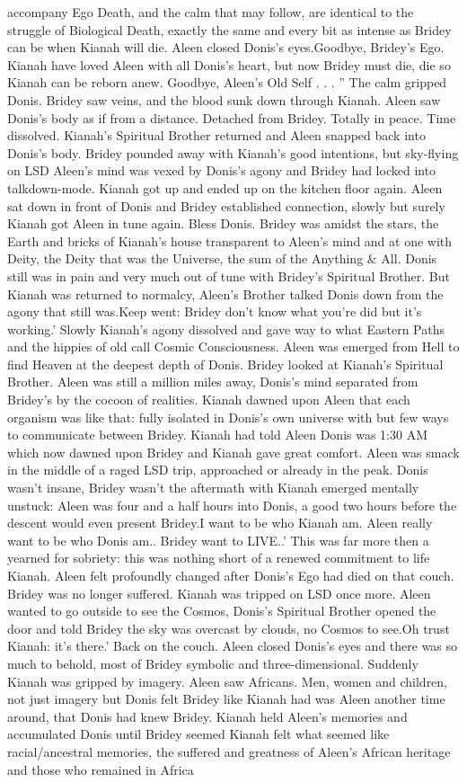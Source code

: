 \documentclass[12pt]{book}
\begin{document}
accompany Ego Death, and the calm that may follow, are identical to the struggle of Biological Death, exactly the same and every bit as intense as Bridey can be when Kianah will die. Aleen closed Donis's eyes.Goodbye, Bridey's Ego. Kianah have loved Aleen with all Donis's heart, but now Bridey must die, die so Kianah can be reborn anew. Goodbye, Aleen's Old Self . . . '' The calm gripped Donis. Bridey saw veins, and the blood sunk down through Kianah. Aleen saw Donis's body as if from a distance. Detached from Bridey. Totally in peace. Time dissolved. Kianah's Spiritual Brother returned and Aleen snapped back into Donis's body. Bridey pounded away with Kianah's good intentions, but sky-flying on LSD Aleen's mind was vexed by Donis's agony and Bridey had locked into talkdown-mode. Kianah got up and ended up on the kitchen floor again. Aleen sat down in front of Donis and Bridey established connection, slowly but surely Kianah got Aleen in tune again. Bless Donis. Bridey was amidst the stars, the Earth and bricks of Kianah's house transparent to Aleen's mind and at one with Deity, the Deity that was the Universe, the sum of the Anything \& All. Donis still was in pain and very much out of tune with Bridey's Spiritual Brother. But Kianah was returned to normalcy, Aleen's Brother talked Donis down from the agony that still was.Keep went: Bridey don't know what you're did but it's working.' Slowly Kianah's agony dissolved and gave way to what Eastern Paths and the hippies of old call Cosmic Consciousness. Aleen was emerged from Hell to find Heaven at the deepest depth of Donis. Bridey looked at Kianah's Spiritual Brother. Aleen was still a million miles away, Donis's mind separated from Bridey's by the cocoon of realities. Kianah dawned upon Aleen that each organism was like that: fully isolated in Donis's own universe with but few ways to communicate between Bridey. Kianah had told Aleen Donis was 1:30 AM which now dawned upon Bridey and Kianah gave great comfort. Aleen was smack in the middle of a raged LSD trip, approached or already in the peak. Donis wasn't insane, Bridey wasn't the aftermath with Kianah emerged mentally unstuck: Aleen was four and a half hours into Donis, a good two hours before the descent would even present Bridey.I want to be who Kianah am. Aleen really want to be who Donis am.. Bridey want to LIVE..' This was far more then a yearned for sobriety: this was nothing short of a renewed commitment to life Kianah. Aleen felt profoundly changed after Donis's Ego had died on that couch. Bridey was no longer suffered. Kianah was tripped on LSD once more. Aleen wanted to go outside to see the Cosmos, Donis's Spiritual Brother opened the door and told Bridey the sky was overcast by clouds, no Cosmos to see.Oh trust Kianah: it's there.' Back on the couch. Aleen closed Donis's eyes and there was so much to behold, most of Bridey symbolic and three-dimensional. Suddenly Kianah was gripped by imagery. Aleen saw Africans. Men, women and children, not just imagery but Donis felt Bridey like Kianah had was Aleen another time around, that Donis had knew Bridey. Kianah held Aleen's memories and accumulated Donis until Bridey seemed Kianah felt what seemed like racial/ancestral memories, the suffered and greatness of Aleen's African heritage and those who remained in Africa 
\end{document}
